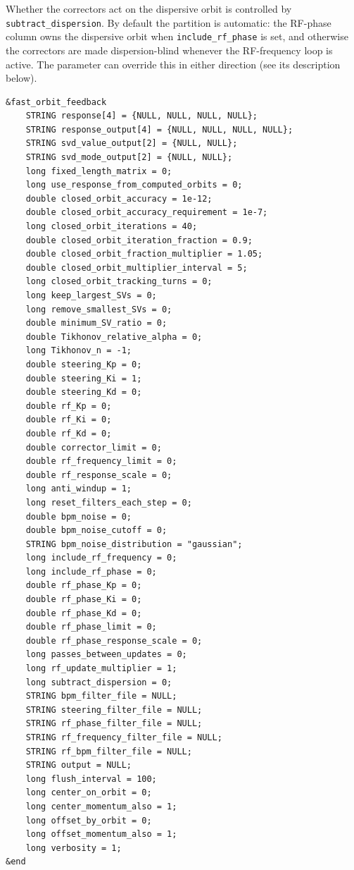 \documentclass[11pt]{article}
\begin{document}
Whether the correctors act on the dispersive orbit is controlled by \verb|subtract_dispersion|.
By default the partition is automatic: the RF-phase column owns the dispersive orbit when
\verb|include_rf_phase| is set, and otherwise the correctors are made dispersion-blind whenever
the RF-frequency loop is active.  The parameter can override this in either direction (see its
description below).

\begin{verbatim}
&fast_orbit_feedback
    STRING response[4] = {NULL, NULL, NULL, NULL};
    STRING response_output[4] = {NULL, NULL, NULL, NULL};
    STRING svd_value_output[2] = {NULL, NULL};
    STRING svd_mode_output[2] = {NULL, NULL};
    long fixed_length_matrix = 0;
    long use_response_from_computed_orbits = 0;
    double closed_orbit_accuracy = 1e-12;
    double closed_orbit_accuracy_requirement = 1e-7;
    long closed_orbit_iterations = 40;
    double closed_orbit_iteration_fraction = 0.9;
    double closed_orbit_fraction_multiplier = 1.05;
    double closed_orbit_multiplier_interval = 5;
    long closed_orbit_tracking_turns = 0;
    long keep_largest_SVs = 0;
    long remove_smallest_SVs = 0;
    double minimum_SV_ratio = 0;
    double Tikhonov_relative_alpha = 0;
    long Tikhonov_n = -1;
    double steering_Kp = 0;
    double steering_Ki = 1;
    double steering_Kd = 0;
    double rf_Kp = 0;
    double rf_Ki = 0;
    double rf_Kd = 0;
    double corrector_limit = 0;
    double rf_frequency_limit = 0;
    double rf_response_scale = 0;
    long anti_windup = 1;
    long reset_filters_each_step = 0;
    double bpm_noise = 0;
    double bpm_noise_cutoff = 0;
    STRING bpm_noise_distribution = "gaussian";
    long include_rf_frequency = 0;
    long include_rf_phase = 0;
    double rf_phase_Kp = 0;
    double rf_phase_Ki = 0;
    double rf_phase_Kd = 0;
    double rf_phase_limit = 0;
    double rf_phase_response_scale = 0;
    long passes_between_updates = 0;
    long rf_update_multiplier = 1;
    long subtract_dispersion = 0;
    STRING bpm_filter_file = NULL;
    STRING steering_filter_file = NULL;
    STRING rf_phase_filter_file = NULL;
    STRING rf_frequency_filter_file = NULL;
    STRING rf_bpm_filter_file = NULL;
    STRING output = NULL;
    long flush_interval = 100;
    long center_on_orbit = 0;
    long center_momentum_also = 1;
    long offset_by_orbit = 0;
    long offset_momentum_also = 1;
    long verbosity = 1;
&end
\end{verbatim}
\end{document}
